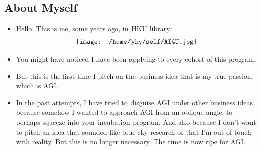 \newcommand{\circled}[1]{{\textcircled{\sffamily \scriptsize{#1}}}}



\begin{preview}

\title{\vspace{-1.5cm} \bfseries\color{blue}{\LARGE Global AGI Project}}

\date{\vspace{-2cm}} %

\maketitle

\setcounter{section}{-1}
\setcounter{mypage}{1}


\begin{minipage}{\textwidth}
\setlength{\parskip}{0.4\baselineskip}

\section{About Myself}

\begin{itemize}

	\item Hello. This is me, some years ago, in HKU library: \\
	\begin{equation}
	\nonumber
	\vcenter{\hbox{\texttt{[image: /home/yky/self/AI4U.jpg]}}}
	\end{equation}

	\item You might have noticed I have been applying to every cohort of this program.
	
	\item But this is the first time I pitch on the business idea that is my true passion, which is AGI.
	
	\item In the past attempts, I have tried to disguise AGI under other business ideas because somehow I wanted to approach AGI from an oblique angle, to perhaps squeeze into your incubation program.  And also because I don't want to pitch an idea that sounded like blue-sky research or that I'm out of touch with reality.  But this is no longer necessary.  The time is now ripe for AGI.
	

\end{itemize}
\end{minipage}
\end{preview}
